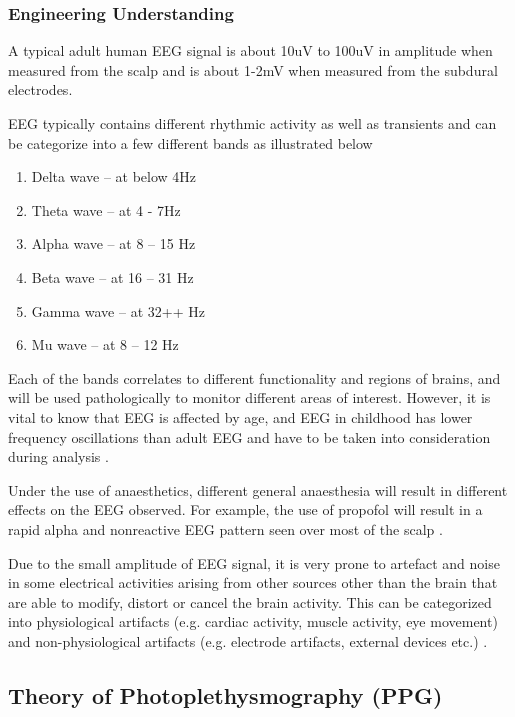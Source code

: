 \subsubsection{Engineering Understanding}

A typical adult human EEG signal is about 10uV to 100uV in amplitude when measured from the scalp and is about 1-2mV when measured from the subdural electrodes. 

EEG typically contains different rhythmic activity as well as transients and can be categorize into a few different bands as illustrated below

\begin{enumerate}
	\item Delta wave – at below 4Hz
	\item Theta wave – at 4 - 7Hz
	\item Alpha wave – at 8 – 15 Hz
	\item Beta wave – at 16 – 31 Hz
	\item Gamma wave – at 32++ Hz
	\item Mu wave – at 8 – 12 Hz
\end{enumerate}


Each of the bands correlates to different functionality and regions of brains, and will be used pathologically to monitor different areas of interest. However, it is vital to know that EEG is affected by age, and EEG in childhood has lower frequency oscillations than adult EEG and have to be taken into consideration during analysis \cite{jiahui3}. 

Under the use of anaesthetics, different general anaesthesia will result in different effects on the EEG observed. For example, the use of propofol will result in a rapid alpha and nonreactive EEG pattern seen over most of the scalp \cite{jiahui4}. 

Due to the small amplitude of EEG signal, it is very prone to artefact and noise in some electrical activities arising from other sources other than the brain that are able to modify, distort or cancel the brain activity. This can be categorized into physiological artifacts (e.g. cardiac activity, muscle activity, eye movement) and non-physiological artifacts (e.g. electrode artifacts, external devices etc.) \cite{jiahui5}.


\subsection{Theory of Photoplethysmography (PPG)}

